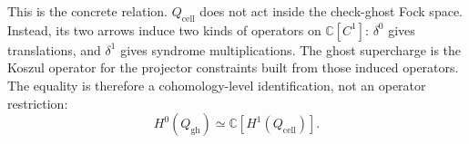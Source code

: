 This is the concrete relation. \(Q_{\mathrm{cell}}\) does not act inside the
check-ghost Fock space. Instead, its two arrows induce two kinds of operators
on \(\mathbb C[C^1]\): \(\delta^0\) gives translations, and \(\delta^1\) gives
syndrome multiplications. The ghost supercharge is the Koszul operator for
the projector constraints built from those induced operators. The equality is
therefore a cohomology-level identification, not an operator restriction:
\[
  H^0(Q_{\mathrm{gh}})
  \simeq
  \mathbb C[H^1(Q_{\mathrm{cell}})].
\]

